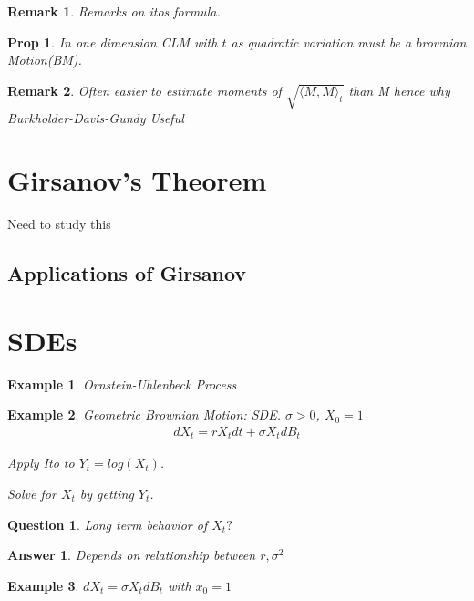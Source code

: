 \documentclass[11pt]{article}
\newtheorem{prop}{Prop}
\newtheorem{remark}{Remark}
\newtheorem{quest}{Question}
\newtheorem{ans}{Answer}
\newtheorem{example}{Example}
\begin{document}
\begin{remark}
	Remarks on itos formula.
\end{remark}

\begin{prop}
	In one dimension CLM with $t$ as quadratic variation must be a brownian Motion(BM).
\end{prop}

\begin{remark}
	Often easier to estimate moments of $\sqrt{\langle M , M \rangle_t}$ than M hence why Burkholder-Davis-Gundy Useful
\end{remark}

\section{Girsanov's Theorem}

Need to study this

\subsection{Applications of Girsanov}

\section{SDEs}

\begin{example}
	Ornstein-Uhlenbeck Process
\end{example}

\begin{example}
	Geometric Brownian Motion: SDE. $\sigma > 0$, $X_0 = 1$
	\begin{align*}
		dX_t = r X_t dt + \sigma X_t dB_t
	\end{align*}

	Apply Ito to $Y_t = log(X_t)$.

	Solve for $X_t$ by getting $Y_t$.
\end{example}

\begin{quest}
	Long term behavior of $X_t?$
\end{quest}

\begin{ans}
	Depends on relationship between $r, \sigma^2$
\end{ans}

\begin{example}
	$dX_t = \sigma X_t dB_t$ with $x_0 = 1$
\end{example}
\end{document}
